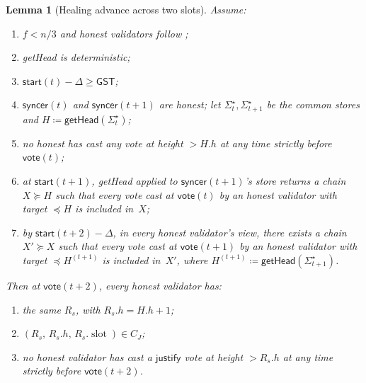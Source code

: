 \documentclass{article}
\newcommand{\slot}[0]{\ensuremath{\operatorname{\mathrm{slot}}}}
\newcommand{\just}{\ensuremath{\mathsf{justify}}\xspace}
\newcommand{\syncer}{\mathsf{syncer}}
\newcommand{\start}{\mathsf{start}}
\newcommand{\vote}{\mathsf{vote}}
\newcommand{\getHead}{\textsf{getHead}\xspace}
\theoremstyle{plain}
\newtheorem{lemma}{Lemma}
\theoremstyle{definition}
\theoremstyle{remark}
\newcommand{\GST}{\ensuremath{\mathsf{GST}}}
\begin{document}
\begin{lemma}[Healing advance across two slots]\label{rev:lem:healing-advance}
Assume:
\begin{enumerate}
  \item $f < n/3$ and honest validators follow ;
  \item \getHead is deterministic;
  \item $\start(t) - \Delta \geq \GST$;
  \item $\syncer(t)$ and $\syncer(t+1)$ are honest; let $\Sigma^\star_t, \Sigma^\star_{t+1}$ be the common stores and $H \coloneqq \getHead(\Sigma^\star_t)$;
  \item no honest has cast any vote at height $> H.h$ at any time strictly before $\vote(t)$;
  \item at $\start(t+1)$, \getHead applied to $\syncer(t+1)$'s store returns a chain $X \succeq H$ such that every vote cast at $\vote(t)$ by an honest validator with target $\preceq H$ is included in~$X$;
  \item by $\start(t+2) - \Delta$, in every honest validator's view, there exists a chain $X' \succeq X$ such that every vote cast at $\vote(t+1)$ by an honest validator with target $\preceq H^{(t+1)}$ is included in~$X'$, where $H^{(t+1)} \coloneqq \getHead(\Sigma^\star_{t+1})$.
\end{enumerate}
Then at $\vote(t+2)$, every honest validator has:
\begin{enumerate}
  \item the same $R_s$, with $R_s.h = H.h + 1$;
  \item $(R_s,\, R_s.h,\, R_s.\slot) \in C_J$;
  \item no honest validator has cast a \just vote at height $> R_s.h$ at any time strictly before $\vote(t+2)$.
\end{enumerate}
\end{lemma}
\end{document}
